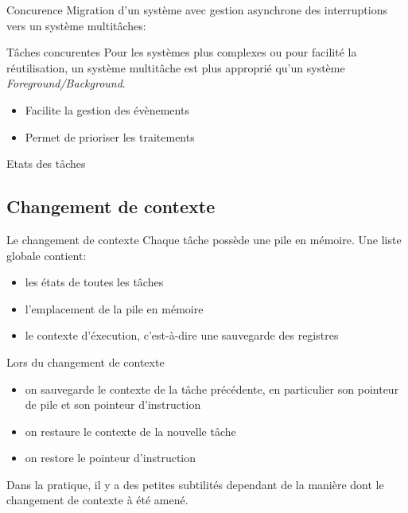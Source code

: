 \begin{frame}{Concurence}
  Migration d'un système avec gestion asynchrone des interruptions vers
  un système multitâches:
  \begin{center}
  \end{center}
\end{frame}

\begin{frame}{Tâches concurentes}
  Pour les  systèmes plus complexes ou pour  facilité la réutilisation,
  un   système   multitâche   est   plus   approprié   qu'un   système
  \emph{Foreground/Background}.
  \begin{itemize}
  \item Facilite la gestion des évènements
  \item Permet de prioriser les traitements
  \end{itemize}
\end{frame}

\begin{frame}{Etats des tâches}
  \begin{center}
    
  \end{center}
\end{frame}


\subsection{Changement de contexte}

\begin{frame}{Le changement de contexte}
  Chaque tâche possède une pile en mémoire. Une liste globale contient:
  \begin{itemize}
  \item les états de toutes les tâches
  \item l'emplacement de la pile en mémoire
  \item le contexte d'éxecution, c'est-à-dire une sauvegarde des registres
  \end{itemize}
  Lors du changement de contexte
  \begin{itemize}
  \item  on  sauvegarde  le   contexte  de  la  tâche  précédente,  en
    particulier son pointeur de pile et son pointeur d'instruction
  \item on restaure le contexte de la nouvelle tâche
  \item on restore le pointeur d'instruction
  \end{itemize}
  Dans  la pratique, il  y a  des petites  subtilités dependant  de la
  manière dont le changement de contexte à été amené.
\end{frame}

